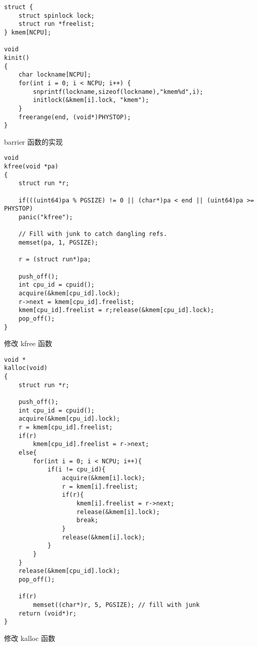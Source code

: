 \begin{listing}[!htb]
	\begin{verbatim}
struct {
    struct spinlock lock;
    struct run *freelist;
} kmem[NCPU];

void
kinit()
{
    char lockname[NCPU];
    for(int i = 0; i < NCPU; i++) {
        snprintf(lockname,sizeof(lockname),"kmem%d",i);
        initlock(&kmem[i].lock, "kmem");
    }
    freerange(end, (void*)PHYSTOP);
}
	\end{verbatim}
	\caption{barrier 函数的实现}\label{lst:kmem_NCPU}
\end{listing}


\begin{listing}[!htb]
	\begin{verbatim}
void
kfree(void *pa)
{
    struct run *r;
    
    if(((uint64)pa % PGSIZE) != 0 || (char*)pa < end || (uint64)pa >= PHYSTOP)
    panic("kfree");

    // Fill with junk to catch dangling refs.
    memset(pa, 1, PGSIZE);
    
    r = (struct run*)pa;
    
    push_off();
    int cpu_id = cpuid();
    acquire(&kmem[cpu_id].lock);
    r->next = kmem[cpu_id].freelist;
    kmem[cpu_id].freelist = r;release(&kmem[cpu_id].lock);
    pop_off();
}
	\end{verbatim}
	\caption{修改 kfree 函数}\label{lst:kfree}
\end{listing}

\begin{listing}[!htb]
	\begin{verbatim}
void *
kalloc(void)
{
    struct run *r;  

    push_off();
    int cpu_id = cpuid();
    acquire(&kmem[cpu_id].lock);
    r = kmem[cpu_id].freelist;
    if(r)
        kmem[cpu_id].freelist = r->next;
    else{
        for(int i = 0; i < NCPU; i++){
            if(i != cpu_id){
                acquire(&kmem[i].lock);
                r = kmem[i].freelist;
                if(r){
                    kmem[i].freelist = r->next;
                    release(&kmem[i].lock);
                    break;
                }
                release(&kmem[i].lock);
            }
        }
    }
    release(&kmem[cpu_id].lock);
    pop_off();
    
    if(r)
        memset((char*)r, 5, PGSIZE); // fill with junk
    return (void*)r;
}
	\end{verbatim}
	\caption{修改 kalloc 函数}\label{lst:kalloc}
\end{listing}

